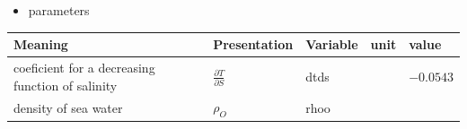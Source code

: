 \begin{itemize}
\tightlist
\item
  parameters
\end{itemize}

\setlength\LTleft{0pt}\setlength\LTright{0pt}\begin{longtable}[]{@{}lllll@{}}
\toprule\relax
\begin{minipage}[b]{0.33\columnwidth}\raggedright
Meaning\strut
\end{minipage} & \begin{minipage}[b]{0.19\columnwidth}\raggedright
Presentation\strut
\end{minipage} & \begin{minipage}[b]{0.06\columnwidth}\raggedright
Variable\strut
\end{minipage} & \begin{minipage}[b]{0.12\columnwidth}\raggedright
unit\strut
\end{minipage} & \begin{minipage}[b]{0.17\columnwidth}\raggedright
value\strut
\end{minipage}\tabularnewline
\midrule\relax
\endhead
\begin{minipage}[t]{0.33\columnwidth}\raggedright
coeficient for a decreasing function of salinity\strut
\end{minipage} & \begin{minipage}[t]{0.19\columnwidth}\raggedright
\(\frac{\partial T}{\partial S}\)\strut
\end{minipage} & \begin{minipage}[t]{0.06\columnwidth}\raggedright
dtds\strut
\end{minipage} & \begin{minipage}[t]{0.12\columnwidth}\raggedright
\strut
\end{minipage} & \begin{minipage}[t]{0.17\columnwidth}\raggedright
\(-0.0543\)\strut
\end{minipage}\tabularnewline
\begin{minipage}[t]{0.33\columnwidth}\raggedright
density of sea water\strut
\end{minipage} & \begin{minipage}[t]{0.19\columnwidth}\raggedright
\(\rho_O\)\strut
\end{minipage} & \begin{minipage}[t]{0.06\columnwidth}\raggedright
rhoo\strut
\end{minipage} & \begin{minipage}[t]{0.12\columnwidth}\raggedright

\end{minipage}
\end{longtable}
